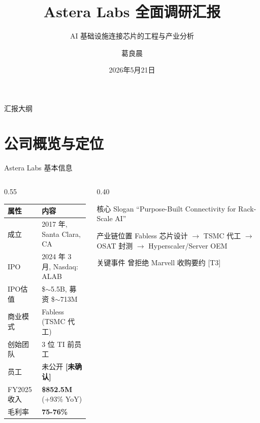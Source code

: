 \documentclass[aspectratio=169, 10pt, UTF8]{ctexbeamer}
\title[Astera Labs 调研]{Astera Labs 全面调研汇报}
\subtitle{AI 基础设施连接芯片的工程与产业分析}
\author[葛良晨]{葛良晨}
\institute[组会汇报]{组会汇报 · 半导体行业分析}
\date{2026年5月21日}
\newcommand{\sourceT}[1]{{\small\textcolor{ieeeBlue}{[T#1]}}}
\newcommand{\unverified}{{\textcolor{ieeeRed}{\textbf{[未确认]}}}}
\begin{document}

\begin{frame}
  \titlepage
\end{frame}

\begin{frame}{汇报大纲}
  \tableofcontents
\end{frame}

\section{公司概览与定位}

\begin{frame}{Astera Labs 基本信息}
  \begin{columns}[T]
    \begin{column}{0.55\textwidth}
      \begin{table}[]
        \begin{tabular}{ll}
          \toprule
          \textbf{属性} & \textbf{内容} \\
          \midrule
          成立 & 2017 年, Santa Clara, CA \\
          IPO & 2024 年 3 月, Nasdaq: ALAB \\
          IPO估值 & \$$\sim$5.5B, 募资 \$$\sim$713M \\
          商业模式 & Fabless (TSMC 代工) \\
          创始团队 & 3 位 TI 前员工 \\
          员工 & 未公开 \unverified{} \\
          FY2025 收入 & \textbf{\$852.5M} (+93\% YoY) \\
          毛利率 & \textbf{75-76\%} \\
          \bottomrule
        \end{tabular}
      \end{table}
    \end{column}
    \begin{column}{0.40\textwidth}
      \begin{block}{核心 Slogan}
        ``Purpose-Built Connectivity for Rack-Scale AI''
      \end{block}

      \begin{exampleblock}{产业链位置}
        Fabless 芯片设计 $\to$ TSMC 代工 $\to$ OSAT 封测 $\to$ Hyperscaler/Server OEM
      \end{exampleblock}

      \begin{alertblock}{关键事件}
        曾拒绝 Marvell 收购要约 \sourceT{3}
      \end{alertblock}
    \end{column}
  \end{columns}
\end{frame}
\end{document}
